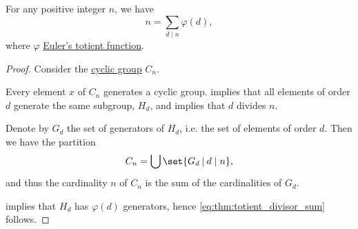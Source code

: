\begin{theorem}\label{thm:totient_divisor_sum}
  For any positive integer \( n \), we have
  \begin{equation}\label{eq:thm:totient_divisor_sum}
    n = \sum_{d \mid n} \varphi(d),
  \end{equation}
  where \( \varphi \) \hyperref[def:eulers_totient_function]{Euler's totient function}.
\end{theorem}
\begin{proof}
  Consider the \hyperref[def:cyclic_group]{cyclic group} \( C_n \).

  Every element \( x \) of \( C_n \) generates a cyclic group.  implies that all elements of order \( d \) generate the same subgroup, \( H_d \), and  implies that \( d \) divides \( n \).

  Denote by \( G_d \) the set of generators of \( H_d \), i.e. the set of elements of order \( d \). Then we have the partition
  \begin{equation*}
    C_n = \bigcup \set{ G_d \given d \mid n },
  \end{equation*}
  and thus the cardinality \( n \) of \( C_n \) is the sum of the cardinalities of \( G_d \).

   implies that \( H_d \) has \( \varphi(d) \) generators, hence \eqref{eq:thm:totient_divisor_sum} follows.
\end{proof}

